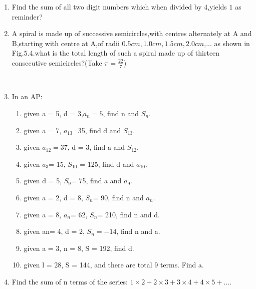 \begin{enumerate}[label=\thechapter.\arabic*,ref=\thechapter.\theenumi]
\item Find the sum of all two digit numbers which when divided by $4$,yields $1$ as reminder?\\
\solution
\pagebreak

\item A spiral is made up of successive semicircles,with centres alternately at A and B,starting with centre at A,of radii $0.5cm,1.0cm,1.5cm,2.0cm$,... as shown in Fig.$5.4$.what is the total length of such a spiral made up of thirteen consecutive semicircles?(Take $\pi=\frac{22}{7}$)\\
\\
\solution
\pagebreak

\item In an AP:
\begin{enumerate}
\item given a = 5, d = 3,$a_n=5$, find n and $S_n$.
\item given a = 7, $a_{13}$=35, find d and $S_{13}$.
\item given $a_{12}=37$, d = 3, find a and $S_{12}$.
\item given $a_3$= 15, $S_{10}$ = 125, find d and $a_{10}$.
\item given d = 5, $S_9$= 75, find a and $a_9$.
\item given a = 2, d = 8, $S_n$= 90, find n and $a_n$.
\item given a = 8, $a_n$= 62, $S_n$= 210, find n and d.
\item given an= 4, d = 2, $S_n=-14$, find n and a.
\item given a = 3, n = 8, S = 192, find d.
\item given l = 28, S = 144, and there are total 9 terms. Find a.\\
\end{enumerate}
\solution
\pagebreak

\item Find the sum of n terms of the series:
$1\times2+2\times3+3\times4+4\times5+....$\\
\solution
\pagebreak
\end{enumerate}
